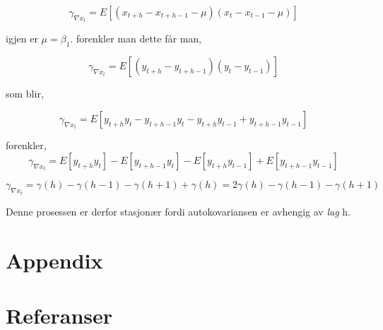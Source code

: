 \documentclass[12pt]{article}
\begin{document}
{  \begin{equation*}
  \gamma_{\nabla x_{t}} = E[(x_{t+h} - x_{t+h - 1} - \mu)(x_{t} - x_{t- 1} - \mu)]
\end{equation*}

igjen er $\mu = \beta_{1}$. forenkler man dette får man,

  \begin{equation*}
  \gamma_{\nabla x_{t}} = E[(y_{t+h} - y_{t+h-1})(y_{t} - y_{t-1})]
\end{equation*}

som blir,

   \begin{equation*}
  \gamma_{\nabla x_{t}} = E[y_{t+h}y_{t} - y_{t+h-1}y_{t} - y_{t+h}y_{t-1} + y_{t+h-1}y_{t-1}]
\end{equation*}

forenkler,
\begin{equation*}
  \gamma_{\nabla x_{t}} = E[y_{t+h}y_{t}] - E[y_{t+h-1}y_{t}] - E[y_{t+h}y_{t-1}] + E[y_{t+h-1}y_{t-1}]
\end{equation*}

\begin{equation*}
  \gamma_{\nabla x_{t}} = \gamma(h) - \gamma(h - 1) - \gamma(h + 1) + \gamma(h) = 2\gamma(h) - \gamma(h - 1) - \gamma(h + 1)
\end{equation*}

Denne prosessen er derfor stasjonær fordi autokovariansen er avhengig av \emph{lag} h.







\newpage
\section{Appendix}
\section{Referanser}
\begingroup
\renewcommand{\section}[2]{}%


\endgroup


 
\end{document}
